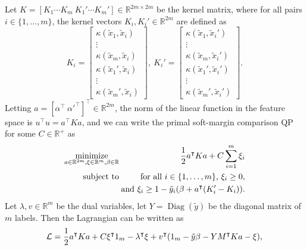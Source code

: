 \documentclass{article}
\newcommand{\RR}{\mathbb R}
\DeclareMathOperator*{\Diag}{Diag}
\DeclareMathOperator*{\minimize}{minimize}
\begin{document}
Let $K=[K_1\cdots K_m\ K_1'\cdots K_m']\in\RR^{2m\times 2m}$ be the
kernel matrix, where for all pairs $i\in\{1, \dots, m\}$, the kernel
vectors $K_i,K_i'\in\RR^{2m}$ are defined as
\begin{equation}
  K_i = \left[
    \begin{array}{c}
      \kappa(\tilde x_1, \tilde x_i)\\
      \vdots\\
      \kappa(\tilde x_m, \tilde x_i)\\
      \kappa(\tilde x_1', \tilde x_i)\\
      \vdots\\
      \kappa(\tilde x_m', \tilde x_i)
    \end{array}
  \right],\ 
  K_i' = \left[
    \begin{array}{c}
      \kappa(\tilde x_1, \tilde x_i')\\
      \vdots\\
      \kappa(\tilde x_m, \tilde x_i')\\
      \kappa(\tilde x_1', \tilde x_i')\\
      \vdots\\
      \kappa(\tilde x_m', \tilde x_i')
    \end{array}
  \right].
\end{equation}
Letting $a=[\alpha^\intercal\
\alpha'^\intercal]^\intercal\in\RR^{2m}$, the norm of the linear
function in the feature space is $u^\intercal u = a^\intercal K a$,
and we can write the primal soft-margin comparison QP for some
$C\in\RR^+$ as
  \begin{eqnarray}
      \minimize_{a\in\RR^{2m},\xi\in\RR^m,\beta\in\RR}\ \ &&\hskip -0.5cm 
      \frac 1 2 a^\intercal K a + C\sum_{i=1}^m \xi_i \\
      \text{subject to}\ \ &&\hskip -0.5cm \nonumber
      \text{for all $i\in\{1,\dots,m\}$, }
      \xi_i \geq 0,\\
      &&\hskip -0.5cm \nonumber \text{and }
      \xi_i \geq 1-\tilde y_i(\beta + a^\intercal (K_i'-K_i)).
  \end{eqnarray}
Let $\lambda, v\in\RR^m$ be the dual variables, let $Y=\Diag(\tilde
y)$ be the diagonal matrix of $m$ labels. Then the Lagrangian can be
written as
\begin{equation}
  \label{eq:lagrangian}
  \mathcal L = \frac 1 2 a^\intercal K a + C\xi^\intercal 1_{m}\\
  -\lambda^\intercal \xi + v^\intercal(1_m - \tilde y\beta - Y M^\intercal K a - \xi),
\end{equation}
\end{document}
